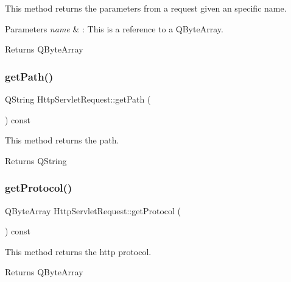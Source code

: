 This method returns the parameters from a request given an specific name. 


\begin{DoxyParams}{Parameters}
{\em name} & \+: This is a reference to a Q\+Byte\+Array. \\
\hline
\end{DoxyParams}
\begin{DoxyReturn}{Returns}
Q\+Byte\+Array 
\end{DoxyReturn}
\mbox{\label{class_http_servlet_request_a99e9035246e9ba9701f4f0a435c2161c}} 
\subsubsection{\texorpdfstring{get\+Path()}{getPath()}}
{\footnotesize\ttfamily Q\+String Http\+Servlet\+Request\+::get\+Path (\begin{DoxyParamCaption}{ }\end{DoxyParamCaption}) const}



This method returns the path. 

\begin{DoxyReturn}{Returns}
Q\+String 
\end{DoxyReturn}
\mbox{\label{class_http_servlet_request_af41af16fdcb738253fe34eaacff17af1}} 
\subsubsection{\texorpdfstring{get\+Protocol()}{getProtocol()}}
{\footnotesize\ttfamily Q\+Byte\+Array Http\+Servlet\+Request\+::get\+Protocol (\begin{DoxyParamCaption}{ }\end{DoxyParamCaption}) const}



This method returns the http protocol. 

\begin{DoxyReturn}{Returns}
Q\+Byte\+Array 
\end{DoxyReturn}
\mbox{\label{class_http_servlet_request_a965af0d27573882ca8a09cc813530a42}} 
